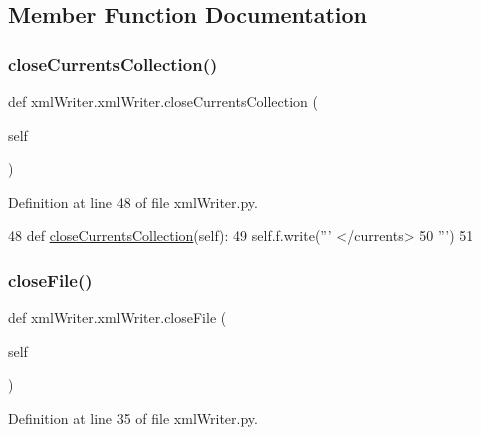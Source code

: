 \subsection{Member Function Documentation}
\mbox{\label{classxml_writer_1_1xml_writer_adfbe5387ec461435f294e98767cff534}} 
\subsubsection{\texorpdfstring{close\+Currents\+Collection()}{closeCurrentsCollection()}}
{\footnotesize\ttfamily def xml\+Writer.\+xml\+Writer.\+close\+Currents\+Collection (\begin{DoxyParamCaption}\item[{}]{self }\end{DoxyParamCaption})}



Definition at line 48 of file xml\+Writer.\+py.


\begin{DoxyCode}
48     \textcolor{keyword}{def }\mbox{\hyperlink{classxml_writer_1_1xml_writer_adfbe5387ec461435f294e98767cff534}{closeCurrentsCollection}}(self):
49         self.f.write(\textcolor{stringliteral}{'''    </currents>}
50 \textcolor{stringliteral}{'''})
51 
\end{DoxyCode}
\mbox{\label{classxml_writer_1_1xml_writer_ad0738ca597cf9a517e13e50bb3be5c96}} 
\subsubsection{\texorpdfstring{close\+File()}{closeFile()}}
{\footnotesize\ttfamily def xml\+Writer.\+xml\+Writer.\+close\+File (\begin{DoxyParamCaption}\item[{}]{self }\end{DoxyParamCaption})}



Definition at line 35 of file xml\+Writer.\+py.


